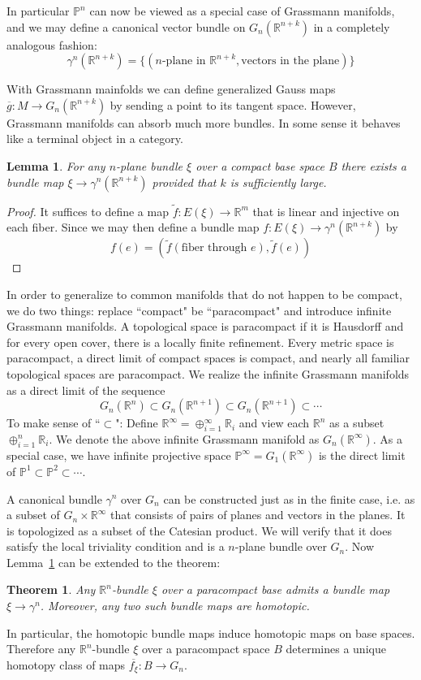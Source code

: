 \documentclass[12pt]{article}
\theoremstyle{plain}
\newtheorem{theorem}[equation]{Theorem}
\newtheorem{lemma}[equation]{Lemma}
\theoremstyle{definition}
\newcommand{\IP}{\mathbb{P}}
\newcommand{\IR}{\mathbb{R}}
\newcommand{\<}{\langle}
\renewcommand{\>}{\rangle}
\def\wt{\widetilde}
\newcommand{\wb}{\overline}
\newcommand{\tG}{G_n(\IR^{n + k})}
\begin{document}
In particular $\IP^n$ can now be viewed as a special case of Grassmann manifolds, and we may define a canonical vector bundle on $G_n(\IR^{n + k})$ in a completely analogous fashion: $$\gamma^n(\IR^{n + k}) = \{ (\text{$n$-plane in }\IR^{n + k}, \text{vectors in the plane}) \}$$ 

With Grassmann mainfolds we can define generalized Gauss maps $\wb{g} : M \to \tG$ by sending a point to its tangent space. However, Grassmann manifolds can absorb much more bundles. In some sense it behaves like a terminal object in a category. 

\begin{lemma}
\label{complemma}
For any $n$-plane bundle $\xi$ over a compact base space $B$ there exists a bundle map $\xi \to \gamma^n(\IR^{n + k})$ provided that $k$ is sufficiently large. 
\end{lemma}
\begin{proof}
It suffices to define a map $\wt{f} : E(\xi) \to \IR^m$ that is linear and injective on each fiber. Since we may then define a bundle map $f : E(\xi) \to \gamma^n(\IR^{n + k})$ by 
$$ f(e) = ( \wt{f}(\text{fiber through }e), \wt{f}(e) )$$

\end{proof}

In order to generalize to common manifolds that do not happen to be compact, we do two things: replace ``compact" be ``paracompact" and introduce infinite Grassmann manifolds. A topological space is paracompact if it is Hausdorff and for every open cover, there is a locally finite refinement. Every metric space is paracompact, a direct limit of compact spaces is compact, and nearly all familiar topological spaces are paracompact. We realize the infinite Grassmann manifolds as a direct limit of the sequence 
$$ G_n(\IR^n) \subset G_n(\IR^{n+1}) \subset G_n(\IR^{n + 1}) \subset \cdots $$
To make sense of ``$\subset$": Define $\IR^\infty = \oplus_{i = 1}^\infty \IR_i$ and view each $\IR^n$ as a subset $\oplus_{i = 1}^n \IR_i$. We denote the above infinite Grassmann manifold as $G_n(\IR^\infty)$. As a special case, we have infinite projective space $\IP^\infty = G_1(\IR^\infty)$ is the direct limit of $\IP^1 \subset \IP^2 \subset \cdots$. 

A canonical bundle $\gamma^n$ over $G_n$ can be constructed just as in the finite case, i.e. as a subset of $G_n \times \IR^\infty$ that consists of pairs of planes and vectors in the planes. It is topologized as a subset of the Catesian product. We will verify that it does satisfy the local triviality condition and is a $n$-plane bundle over $G_n$. Now Lemma~\ref{complemma} can be extended to the theorem:
\begin{theorem}
Any $\IR^n$-bundle $\xi$ over a paracompact base admits a bundle map $\xi \to \gamma^n$. Moreover, any two such bundle maps are homotopic. 
\end{theorem}
In particular, the homotopic bundle maps induce homotopic maps on base spaces. Therefore any $\IR^n$-bundle $\xi$ over a paracompact space $B$ determines a unique homotopy class of maps $\wb{f_\xi} : B \to G_n$. 
\end{document}
